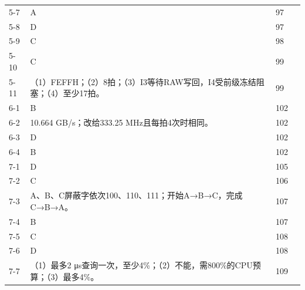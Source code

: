 \documentclass{sidenotes-simplex}
\begin{document}
{\begin{longtable}{@{}p{18mm}p{87mm}p{20mm}p{20mm}@{}}
5-7 & A & 97 & \hyperref[a:CO05-E07]{\pageref*{a:CO05-E07}} \\
5-8 & D & 97 & \hyperref[a:CO05-E08]{\pageref*{a:CO05-E08}} \\
5-9 & C & 98 & \hyperref[a:CO05-E09]{\pageref*{a:CO05-E09}} \\
5-10 & C & 99 & \hyperref[a:CO05-E10]{\pageref*{a:CO05-E10}} \\
5-11 & （1）FEFFH；（2）8拍；（3）I3等待RAW写回，I4受前级冻结阻塞；（4）至少17拍。 & 99 & \hyperref[a:CO05-E11]{\pageref*{a:CO05-E11}} \\
6-1 & B & 102 & \hyperref[a:CO06-E01]{\pageref*{a:CO06-E01}} \\
6-2 & 10.664 GB/s；改给333.25 MHz且每拍4次时相同。 & 102 & \hyperref[a:CO06-E02]{\pageref*{a:CO06-E02}} \\
6-3 & D & 102 & \hyperref[a:CO06-E03]{\pageref*{a:CO06-E03}} \\
6-4 & B & 102 & \hyperref[a:CO06-E04]{\pageref*{a:CO06-E04}} \\
7-1 & D & 105 & \hyperref[a:CO07-E01]{\pageref*{a:CO07-E01}} \\
7-2 & C & 106 & \hyperref[a:CO07-E02]{\pageref*{a:CO07-E02}} \\
7-3 & A、B、C屏蔽字依次100、110、111；开始A→B→C，完成C→B→A。 & 107 & \hyperref[a:CO07-E03]{\pageref*{a:CO07-E03}} \\
7-4 & B & 107 & \hyperref[a:CO07-E04]{\pageref*{a:CO07-E04}} \\
7-5 & C & 108 & \hyperref[a:CO07-E05]{\pageref*{a:CO07-E05}} \\
7-6 & D & 108 & \hyperref[a:CO07-E06]{\pageref*{a:CO07-E06}} \\
7-7 & （1）最多2 μs查询一次，至少4\%；（2）不能，需800\%的CPU预算；（3）最多4\%。 & 109 & \hyperref[a:CO07-E07]{\pageref*{a:CO07-E07}} \\
\end{longtable}}
\end{document}

